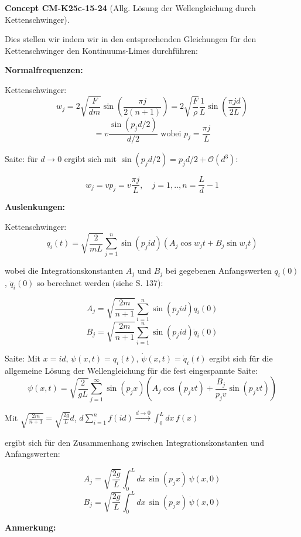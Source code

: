 \documentclass[10pt, letterpaper]{article}
\newcommand{\CustomHeading}[3]{%
  \par\medskip\noindent%
  \textbf{#1 #2} \textnormal{(#3)}.\enskip%
}
\newenvironment{CONC}[2]{\begin{unitbox}\CustomHeading{Concept}{#1}{#2}}{\end{unitbox}}
\begin{document}
\begin{CONC}{CM-K25c-15-24}{Allg. Lösung der Wellengleichung durch Kettenschwinger}
Dies stellen wir indem wir in den entsprechenden Gleichungen für den Kettenschwinger den Kontinuums-Limes durchführen:

\textbf{Normalfrequenzen:}

Kettenschwinger: \[w_j = 2\sqrt{\frac{F}{dm}}\sin\left(\frac{\pi j}{2(n+1)}\right) = 2\sqrt{\frac{F}{\rho}}\frac{1}{L}\sin\left(\frac{\pi j d}{2L}\right)\]
\[= v\frac{\sin(p_j d/2)}{d/2} \text{ wobei } p_j = \frac{\pi j}{L}\]

Saite: für $d\to 0$ ergibt sich mit $\sin(p_j d/2) = p_j d/2 + \mathcal{O}(d^3)$:

\[w_j = vp_j = v\frac{\pi j}{L}, \quad j=1,..,n=\frac{L}{d}-1\]

\textbf{Auslenkungen:}

Kettenschwinger: \[q_i(t) = \sqrt{\frac{2}{mL}}\sum_{j=1}^n\sin(p_j id)(A_j\cos w_jt + B_j\sin w_jt)\]

wobei die Integrationskonstanten $A_j$ und $B_j$ bei gegebenen Anfangswerten $q_i(0)$, $\dot{q}_i(0)$ so berechnet werden (siehe S. 137):

\[A_j = \sqrt{\frac{2m}{n+1}}\sum_{i=1}^n\sin(p_j id)q_i(0)\]
\[B_j = \sqrt{\frac{2m}{n+1}}\sum_{i=1}^n\sin(p_j id)\dot{q}_i(0)\]

Saite: Mit $x = id$, $\psi(x,t) = q_i(t)$, $\dot{\psi}(x,t) = \dot{q}_i(t)$ ergibt sich für die allgemeine Lösung der Wellen\-gleichung für die fest eingespannte Saite:
\[\psi(x,t) = \sqrt{\frac{2}{gL}}\sum_{j=1}^\infty \sin(p_j x)\left(A_j\cos(p_j vt) + \frac{B_j}{p_j v}\sin(p_j vt)\right)\]

Mit $\sqrt{\frac{2m}{n+1}} = \sqrt{\frac{2g}{L}}d$, $d\sum_{i=1}^n f(id) \xrightarrow{d\to 0} \int_0^L dx\, f(x)$

ergibt sich für den Zusammenhang zwischen Integrationskonstanten und Anfangswerten:

\[A_j = \sqrt{\frac{2g}{L}}\int_0^L dx\,\sin(p_j x)\,\psi(x,0)\]
\[B_j = \sqrt{\frac{2g}{L}}\int_0^L dx\,\sin(p_j x)\,\dot{\psi}(x,0)\]
\end{CONC}

\textbf{Anmerkung:}
\end{document}
